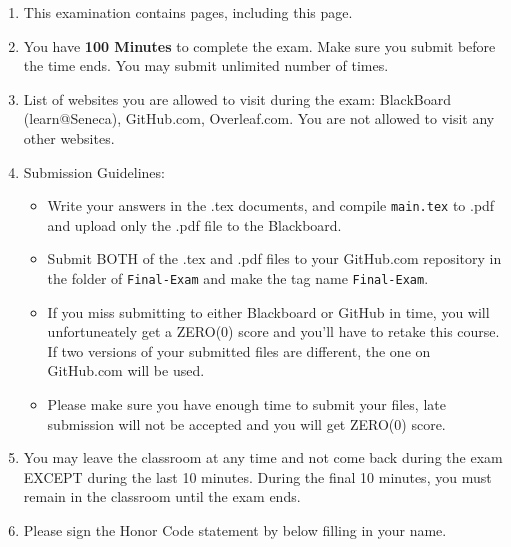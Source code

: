 \documentclass[answer]{exam}  %
\begin{document}
    \begin{enumerate}[label=\arabic*.]
        
        \item This examination contains \pageref{LastPage} pages, including this page.

        \item You have \textbf{100 Minutes} to complete the exam. Make sure you submit before the time ends. You may submit unlimited number of times. 
        
        \item List of websites you are allowed to visit during the exam: BlackBoard (learn@Seneca), GitHub.com, Overleaf.com. You are not allowed to visit any other websites.

        \item Submission Guidelines:
        \begin{itemize}
            \item Write your answers in the .tex documents, and compile \texttt{main.tex} to .pdf and upload only the .pdf file to the Blackboard. 
            \item Submit BOTH of the .tex and .pdf files to your GitHub.com repository in the folder of \texttt{Final-Exam} and make the tag name \texttt{Final-Exam}.
            \item If you miss submitting to either Blackboard or GitHub in time, you will unfortuneately get a ZERO(0) score and you'll have to retake this course. If two versions of your submitted files are different, the one on GitHub.com will be used.
            \item Please make sure you have enough time to submit your files, late submission will not be accepted and you will get ZERO(0) score.
        \end{itemize}
        
        \item You may leave the classroom at any time and not come back during the exam EXCEPT during the last 10 minutes. During the final 10 minutes, you must remain in the classroom until the exam ends.

        \item Please sign the Honor Code statement by below filling in your name.
    \end{enumerate}

\fi

\end{document}
